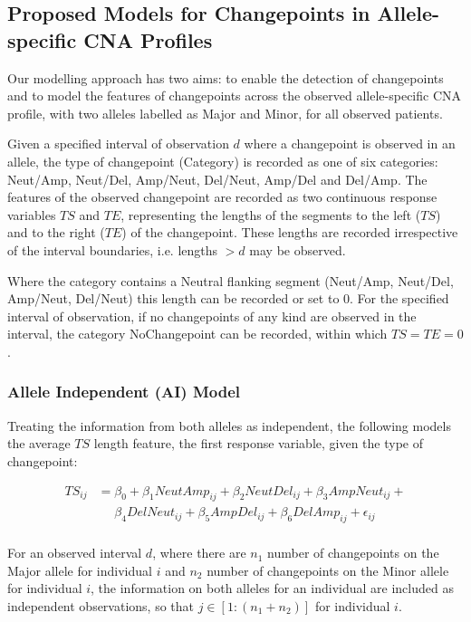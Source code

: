 \subsection{Proposed Models for Changepoints in Allele-specific CNA Profiles} \label{models}
Our modelling approach has two aims: to enable the detection of changepoints and to model the features of changepoints across the observed allele-specific CNA profile, with two alleles labelled as Major and Minor, for all observed patients. 

Given a specified interval of observation $d$ where a changepoint is observed in an allele, the type of changepoint (Category) is recorded as one of six categories: Neut/Amp, Neut/Del, Amp/Neut, Del/Neut, Amp/Del and Del/Amp. The features of the observed changepoint are recorded as two continuous response variables $TS$ and $TE$, representing the lengths of the segments to the left ($TS$) and to the right ($TE$) of the changepoint. These lengths are recorded irrespective of the interval boundaries, i.e. lengths $>d$ may be observed. 

Where the category contains a Neutral flanking segment (Neut/Amp, Neut/Del, Amp/Neut, Del/Neut) this length can be recorded or set to 0. For the specified interval of observation, if no changepoints of any kind are observed in the interval, the category NoChangepoint can be recorded, within which $TS=TE=0$.

\subsubsection{Allele Independent (AI) Model} \label{Model1}
Treating the information from both alleles as independent, the following models the average $TS$ length feature, the first response variable, given the type of changepoint: 

\begin{equation}
\begin{aligned}
TS_{ij}&=\beta_0+ \beta_1 NeutAmp_{ij} + \beta_2NeutDel_{ij}+ \beta_3AmpNeut_{ij} +  \\
       & \mathrel{\phantom{=}} \beta_4DelNeut_{ij}+ \beta_5AmpDel_{ij} + \beta_6DelAmp_{ij} + \epsilon_{ij}\\
\end{aligned}
\label{Eq1}
\end{equation}

For an observed interval $d$, where there are $n_1$ number of changepoints on the Major allele for individual $i$ and $n_2$ number of changepoints on the Minor allele for individual $i$, the information on both alleles for an individual are included as independent observations, so that $j\in [1: (n_1+n_2)]$ for individual $i$.

